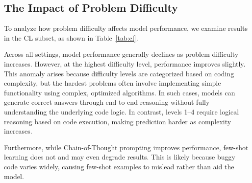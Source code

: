 \subsection{The Impact of Problem Difficulty}

To analyze how problem difficulty affects model performance, we examine results in the CL subset, as shown in Table~\ref{tab:cl}.

Across all settings, model performance generally declines as problem difficulty increases. However, at the highest difficulty level, performance improves slightly. This anomaly arises because difficulty levels are categorized based on coding complexity, but the hardest problems often involve implementing simple functionality using complex, optimized algorithms. In such cases, models can generate correct answers through end-to-end reasoning without fully understanding the underlying code logic. In contrast, levels 1–4 require logical reasoning based on code execution, making prediction harder as complexity increases.

Furthermore, while Chain-of-Thought prompting improves performance, few-shot learning does not and may even degrade results. This is likely because buggy code varies widely, causing few-shot examples to mislead rather than aid the model.

